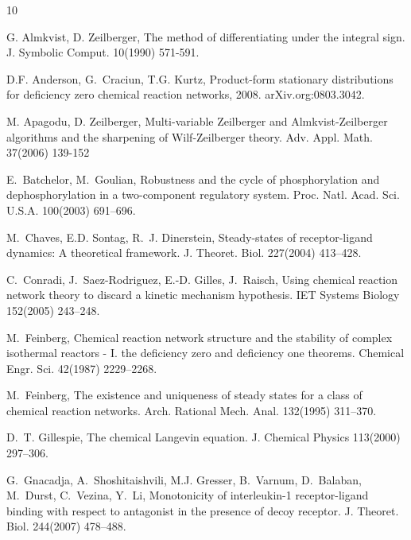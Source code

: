 \documentclass[11pt]{article}
\begin{document}
\begin{thebibliography}{10}

\newcommand{\optionalemph}[1]{#1} %
\newcommand{\optionalbf}[1]{#1}   %

G. Almkvist, D. Zeilberger,
\optionalemph{The method of differentiating under the integral sign}.
J. Symbolic Comput.
\optionalbf{10}(1990) 571-591.
 
D.F. Anderson, G.~Craciun,  T.G. Kurtz,
Product-form stationary distributions for deficiency zero chemical
  reaction networks, 2008.
arXiv.org:0803.3042.

M. Apagodu, D. Zeilberger,
\optionalemph{Multi-variable Zeilberger and Almkvist-Zeilberger algorithms and the
sharpening of Wilf-Zeilberger theory}.
Adv. Appl. Math. 
\optionalbf{37}(2006) 139-152

E.~Batchelor, M.~Goulian,
{{R}obustness and the cycle of phosphorylation and dephosphorylation
  in a two-component regulatory system}.
\optionalemph{Proc. Natl. Acad. Sci. U.S.A.}
100(2003) 691--696.

M.~Chaves, E.D. Sontag,  R.~J. Dinerstein,
Steady-states of receptor-ligand dynamics: {A} theoretical framework.
\optionalemph{J. Theoret. Biol.}
227(2004) 413--428.

C.~Conradi, J.~Saez-Rodriguez, E.-D. Gilles,  J.~Raisch,
Using chemical reaction network theory to discard a kinetic mechanism hypothesis.
\optionalemph{IET Systems Biology}
152(2005) 243--248.

M.~Feinberg,
Chemical reaction network structure and the stability of complex
  isothermal reactors - I. the deficiency zero and deficiency one theorems.
\optionalemph{Chemical Engr. Sci.}
42(1987) 2229--2268.

M.~Feinberg,
The existence and uniqueness of steady states for a class of chemical
  reaction networks.
\optionalemph{ Arch. Rational Mech. Anal.}
132(1995) 311--370.

D.~T. Gillespie,
The chemical Langevin equation.
\optionalemph{J. Chemical Physics}
113(2000) 297--306.

G.~Gnacadja, A.~Shoshitaishvili, M.J. Gresser, B.~Varnum, D.~Balaban, M.~Durst,
  C.~Vezina, Y.~Li,
Monotonicity of interleukin-1 receptor-ligand binding with respect to antagonist in the presence of decoy receptor.
\optionalemph{J. Theoret. Biol.}
244(2007) 478--488.


\end{thebibliography}
\end{document}
